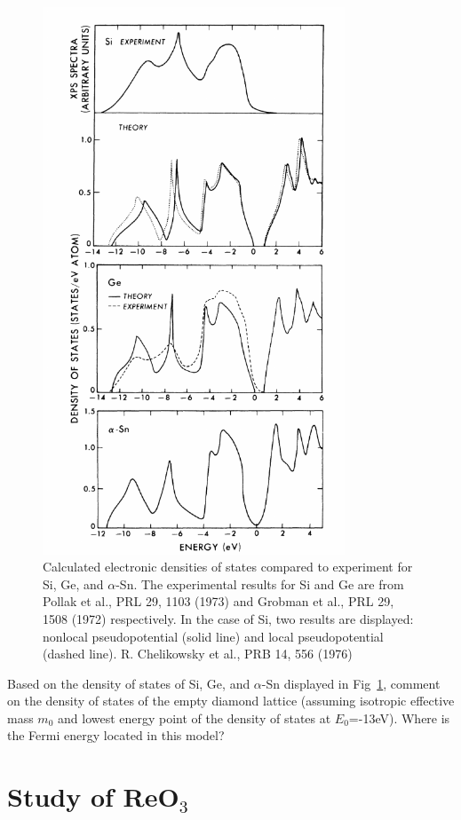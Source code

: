 \begin{figure}[h]
  \centering
  \includegraphics[width=9cm]{DOS_SiGeSn.pdf}
  \caption{Calculated electronic densities of states compared to
    experiment for Si, Ge, and $\alpha$-Sn. The experimental results
    for Si and Ge are from Pollak et al., PRL 29, 1103 (1973) and
    Grobman et al., PRL 29, 1508 (1972) respectively. In the case of Si, two results are
    displayed: nonlocal pseudopotential (solid line) and local
    pseudopotential (dashed line). R. Chelikowsky et al., PRB 14, 556 (1976)\label{fig:dos}}
\end{figure}


Based on the density of states of Si, Ge, and $\alpha$-Sn displayed
in Fig~\ref{fig:dos}, comment on the density of states of the empty
diamond lattice (assuming isotropic effective mass $m_0$ and lowest
energy point of the density of states at $E_0$=-13eV). Where is the
Fermi energy located in this model?

\section{Study of ReO$_3$}


